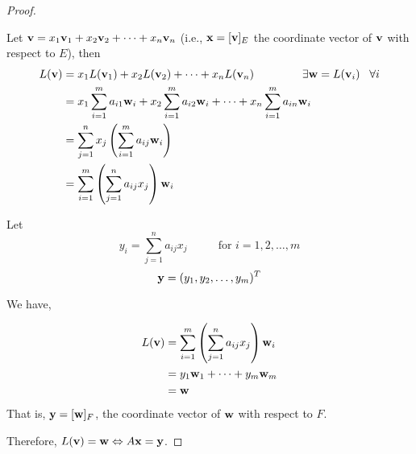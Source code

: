 \begin{theorem}
\begin{proof}
\begin{enumerate}
	


\end{enumerate}



	
Let  ${\bf v} = x_1{\bf v}_1 + x_2 {\bf v}_2 +  \dots  + x_n {\bf v}_n $ (i.e., ${\bf x} = [{\bf v}]_E$ the coordinate vector of ${\bf v}$ with respect to $E$), then
	\begin{align*}
		L({\bf v}) 	&= x_1 L({\bf v}_1) + x_2 L({\bf v}_2) +  \cdots  + x_n L({\bf v}_n) \hspace{1.5cm}  \exists {\bf w} =  L({\bf v}_i ) \;\;\; \forall i \\
				&= x_1 \sum_{i=1}^m  a_{i1} {\bf w}_i  + x_2 \sum_{i=1}^m  a_{i2} {\bf w}_i  +  \dots  + x_n \sum_{i=1}^m  a_{in} {\bf w}_i \\
			&= \sum_{j=1}^n x_j \left(   \sum_{i=1}^m  a_{ij} {\bf w}_i    \right)  \\
			&= \sum_{i=1}^m  \left( \sum_{j=1}^n  a_{ij} x_j \right)  {\bf w}_i 	 
	\end{align*}
	
	Let 
	\[ y_i = \sum_{j=1}^n  a_{ij} x_j     \hspace{1cm} \text{ for }   i = 1, 2, \dots, m \]
	\[ {\bf y} = (y_1, y_2, \dots, y_m)^T \]
	
	We have, 
	
	\begin{align*}
		L({\bf v}) &=\sum_{i=1}^m  \left( \sum_{j=1}^n  a_{ij} x_j \right)  {\bf w}_i \\
				&= y_1 {\bf w}_1 + \cdots + y_m {\bf w}_m\\
				&= {\bf w }
	\end{align*}
	That is, ${\bf y} = [{\bf w}]_F$, the coordinate vector of ${\bf w}$ with respect to $F$. 
	
	Therefore, $L({\bf v}) = {\bf w}  \Leftrightarrow A{\bf x} = {\bf y}$. 
	
	
	


	
	
\end{proof}

\end{theorem}



